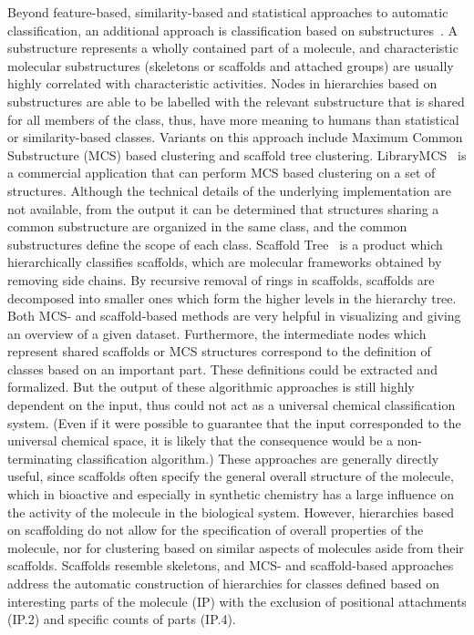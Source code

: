\documentclass[10pt]{bmc_article}
\newenvironment{bmcformat}{\baselineskip20pt\sloppy\setboolean{publ}{false}}{\baselineskip20pt\sloppy}
\begin{document}
\begin{bmcformat}
Beyond feature-based, similarity-based and statistical approaches to automatic classification, an additional approach is classification based on substructures~\cite{deshpande2005}.  A substructure represents a wholly contained part of a molecule, and characteristic molecular substructures (skeletons or scaffolds and attached groups) are usually highly correlated with characteristic activities.  Nodes in hierarchies based on substructures are able to be labelled with the relevant substructure that is shared for all members of the class, thus, have more meaning to humans than statistical or similarity-based classes. Variants on this approach include Maximum Common Substructure (MCS) based clustering and scaffold tree clustering. LibraryMCS~\cite{librarymcs} is a commercial application that can perform MCS based clustering on a set of structures. Although the technical details of the underlying implementation are not available, from the output it can be determined that structures sharing a common substructure are organized in the same class, and the common substructures define the scope of each class.  Scaffold Tree~\cite{Schuffenhauer2007} is a product which hierarchically classifies scaffolds, which are molecular frameworks obtained by removing side chains.  By recursive removal of rings in scaffolds, scaffolds are decomposed into smaller ones which form the higher levels in the hierarchy tree.  Both MCS- and scaffold-based methods are very helpful in visualizing and giving an overview of a given dataset.  Furthermore, the intermediate nodes which represent shared scaffolds or MCS structures correspond to the definition of classes based on an important part.  These definitions could be extracted and formalized.  But the output of these algorithmic approaches is still highly dependent on the input, thus could not act as a universal chemical classification system. (Even if it were possible to guarantee that the input corresponded to the universal chemical space, it is likely that the consequence would be a non-terminating classification algorithm.)  These approaches are generally directly useful, since scaffolds often specify the general overall structure of the molecule, which in bioactive and especially in synthetic chemistry has a large influence on the activity of the molecule in the biological system.  However, hierarchies based on scaffolding do not allow for the specification of overall properties of the molecule, nor for clustering based on similar aspects of molecules aside from their scaffolds.  Scaffolds resemble skeletons, and MCS- and scaffold-based approaches address the automatic construction of hierarchies for classes defined based on interesting parts of the molecule (IP) with the exclusion of positional attachments (IP.2) and specific counts of parts (IP.4). 


\end{bmcformat}
\end{document}
